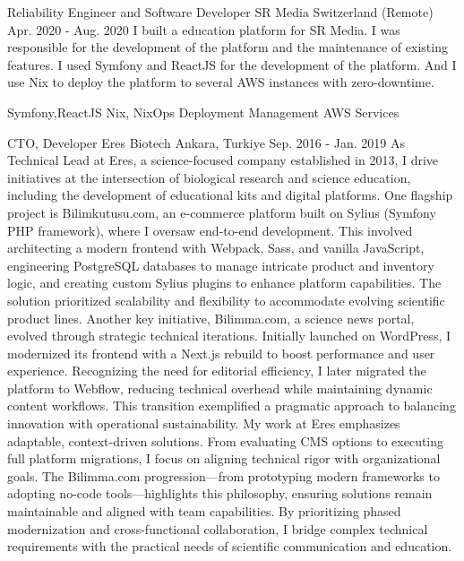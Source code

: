 \begin{cventries}
    \cventry
    {Reliability Engineer and Software Developer} %
    {SR Media} %
    {Switzerland (Remote)} %
    {Apr. 2020 - Aug. 2020} %
    {
      I built a education platform for SR Media. I was responsible for the development of the platform and the maintenance of existing features. I used Symfony and ReactJS for the development of the platform. And I use Nix to deploy the platform to several AWS instances with zero-downtime. 
    }
    {
      \begin{cvsubentries}%
        \cvsubentry {} {Symfony,ReactJS} {} {} 
        \cvsubentry {} {Nix, NixOps} {} {} 
        \cvsubentry {} {Deployment Management} {} {} 
        \cvsubentry {} {AWS Services} {} {} 
      \end{cvsubentries}
    }
    \cventry
    {CTO, Developer} %
    {Eres Biotech} %
    {Ankara, Turkiye} %
    {Sep. 2016 - Jan. 2019} %
    {        As Technical Lead at Eres, a science-focused company established in 2013, I drive initiatives at the intersection of biological research and science education, including the development of educational kits and digital platforms. One flagship project is Bilimkutusu.com, an e-commerce platform built on Sylius (Symfony PHP framework), where I oversaw end-to-end development. This involved architecting a modern frontend with Webpack, Sass, and vanilla JavaScript, engineering PostgreSQL databases to manage intricate product and inventory logic, and creating custom Sylius plugins to enhance platform capabilities. The solution prioritized scalability and flexibility to accommodate evolving scientific product lines.
      Another key initiative, Bilimma.com, a science news portal, evolved through strategic technical iterations. Initially launched on WordPress, I modernized its frontend with a Next.js rebuild to boost performance and user experience. Recognizing the need for editorial efficiency, I later migrated the platform to Webflow, reducing technical overhead while maintaining dynamic content workflows. This transition exemplified a pragmatic approach to balancing innovation with operational sustainability.
  My work at Eres emphasizes adaptable, context-driven solutions. From evaluating CMS options to executing full platform migrations, I focus on aligning technical rigor with organizational goals. The Bilimma.com progression—from prototyping modern frameworks to adopting no-code tools—highlights this philosophy, ensuring solutions remain maintainable and aligned with team capabilities. By prioritizing phased modernization and cross-functional collaboration, I bridge complex technical requirements with the practical needs of scientific communication and education.
}
\end{cventries}
